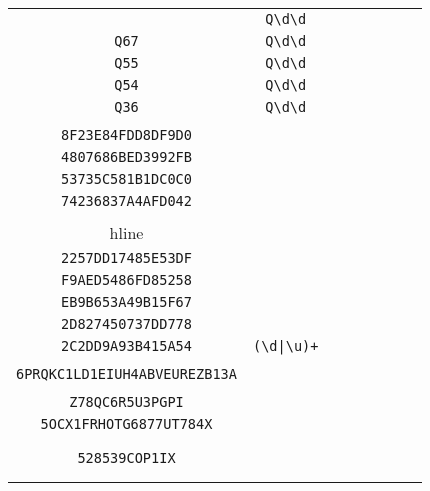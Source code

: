 \begin{longtable}{cccccccc}
\begin{tabular}{ll}
    \verb|Q75| & \verb|Q\d\d|\\
\verb|Q67| & \verb|Q\d\d|\\
\verb|Q55| & \verb|Q\d\d|\\
\verb|Q54| & \verb|Q\d\d|\\
\verb|Q36| & \verb|Q\d\d|
\end{tabular}
\\\midrule 
\begin{tabular}{l}
    \verb|4FF7DE80F4192276|\\
\verb|8F23E84FDD8DF9D0|\\
\verb|4807686BED3992FB|\\
\verb|53735C581B1DC0C0|\\
\verb|74236837A4AFD042|\\
\\hline\\
\verb|2257DD17485E53DF|\\
\verb|F9AED5486FD85258|\\
\verb|EB9B653A49B15F67|\\
\verb|2D827450737DD778|\\
\verb|2C2DD9A93B415A54|
\end{tabular}

&
\verb.(\d|\u)+.
&

\begin{tabular}{l}
    \verb|((\u)*(\d)*\d(\u)*\d(\u)*)*|\\
\verb||\\
\verb|6PRQKC1LD1EIUH4ABVEUREZB13A|\\
\verb||\\
\verb|Z78QC6R5U3PGPI|\\
\verb|5OCX1FRHOTG6877UT784X|
\end{tabular}

&

\begin{tabular}{l}
    \verb|((\u)*(\d)*\d(\u)*\d(\u)*)*|\\
\verb||\\
\verb||\\
\verb|528539COP1IX|\\
\verb||\\
\verb||
\end{tabular}

&


\end{longtable}
